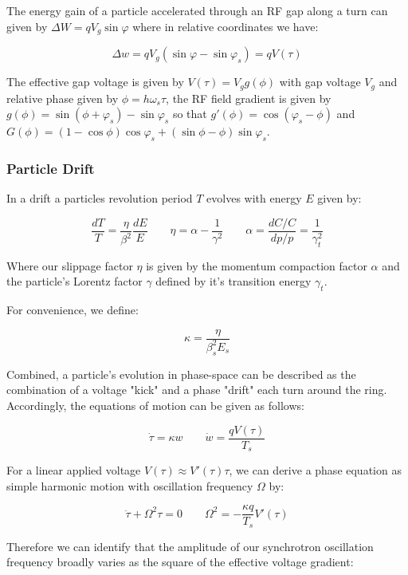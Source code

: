 The energy gain of a particle accelerated through an RF gap along a turn can given by $\Delta W=qV_g\sin\varphi$ \cite{panofsky_considerations_1956} where in relative coordinates we have:

$$\Delta w = q V_g(\sin\varphi-\sin\varphi_s)=q V(\tau)$$

The effective gap voltage is given by $V(\tau) = V_g g(\phi)$ with gap voltage $V_g$ and relative phase given by $\phi = h\omega_s\tau$, the RF field gradient is given by $g(\phi)=\sin(\phi+\varphi_s)-\sin\varphi_s$ so that $g'(\phi)=\cos(\varphi_s-\phi)$ and $G(\phi)=(1-\cos\phi)\cos\varphi_s+(\sin\phi-\phi)\sin\varphi_s$.

\subsubsection{Particle Drift}

In a drift a particles revolution period $T$ evolves with energy $E$ given by:

$$\frac{dT}{T} = \frac{\eta}{\beta^2}\frac{dE}{E} \qquad \eta =\alpha- \frac{1}{\gamma^2} \qquad \alpha = \frac{dC/C}{dp/p} = \frac{1}{\gamma_t^2}$$

Where our slippage factor $\eta$ is given by the momentum compaction factor $\alpha$ and the particle's Lorentz factor $\gamma$ defined by it's transition energy $\gamma_t$.

For convenience, we define:

$$\kappa = \frac{\eta}{\beta_s^2E_s} $$

Combined, a particle's evolution in phase-space can be described as the combination of a voltage "kick" and a phase "drift" each turn around the ring. Accordingly, the equations of motion can be given as follows:

\begin{equation}
    \dot{\tau} = \kappa w \qquad \dot{w} = \frac{qV(\tau)}{T_s}
    \label{eq:eom}
\end{equation}

For a linear applied voltage $V(\tau) \approx V'(\tau)\tau$, we can derive a phase equation as simple harmonic motion with oscillation frequency $\Omega$ by:

$$\ddot{\tau}+\Omega^2\tau = 0 \qquad \Omega^2 = -\frac{\kappa q}{T_s}V'(\tau)$$

Therefore we can identify that the amplitude of our synchrotron oscillation frequency broadly varies as the square of the effective voltage gradient:

